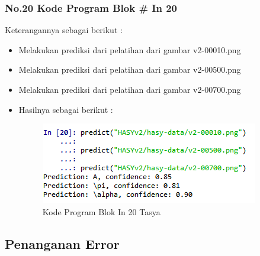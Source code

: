 \subsubsection{No.20 Kode Program Blok \# In 20}

Keterangannya sebagai berikut :\\
\begin{itemize}
\item Melakukan prediksi dari pelatihan dari gambar v2-00010.png
\item Melakukan prediksi dari pelatihan dari gambar v2-00500.png
\item Melakukan prediksi dari pelatihan dari gambar v2-00700.png
\item Hasilnya sebagai berikut :\\
\begin{figure}[ht]
\centering
\includegraphics[scale=0.5]{figures/Chapter 7/1164086/Praktek/chapter7tasya34.png}
\caption{Kode Program Blok In 20 Tasya}
\label{Praktek}
\end{figure}
\end{itemize}

\subsection{Penanganan Error}
